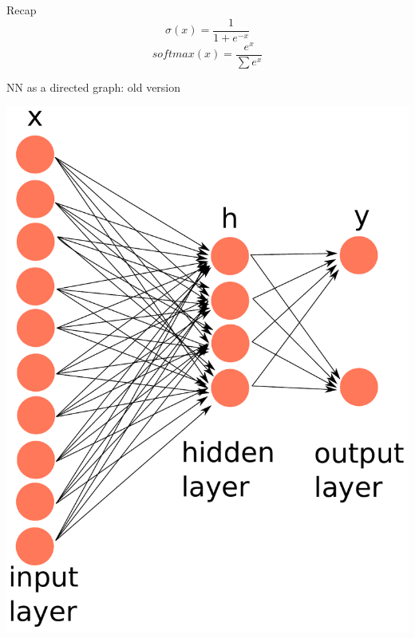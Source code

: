 \documentclass[10pt]{beamer}
\begin{document}
\begin{frame}{Recap}
\Large{
 \vspace{0.2cm}
\begin{equation*}
\sigma(x) = \frac{1}{1 + e^{-x}}
\end{equation*}
\vspace{0.5cm}
 \begin{equation*}
softmax(x) = \frac{e^{x}}{\sum e^{x}}
\end{equation*}
}
\end{frame}



\begin{frame}[fragile]{NN as a directed graph: old version}
\begin{center}
\includegraphics[scale=0.38]{images/OldNN3.pdf}
\end{center}
\end{frame}
\end{document}
